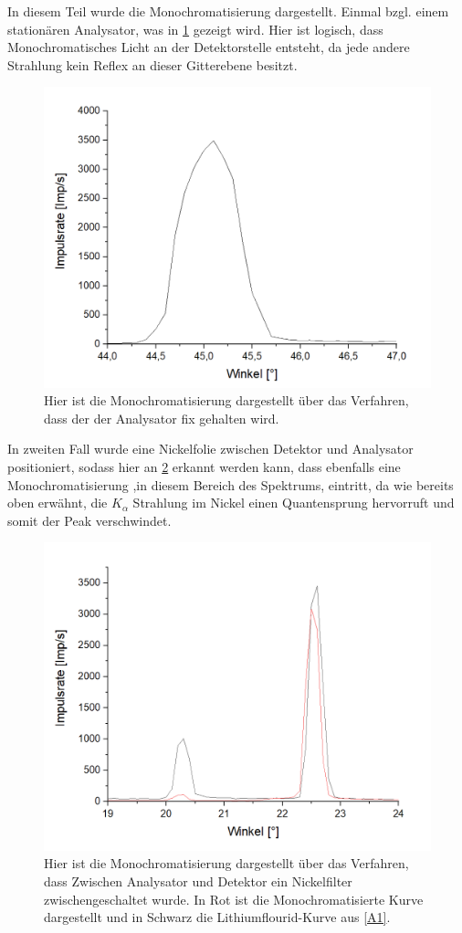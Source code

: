 \documentclass[
	a4paper,
	12pt,
	pagesize,
	ngerman
]{scrartcl}
\begin{document}
In diesem Teil wurde die Monochromatisierung dargestellt. Einmal bzgl. einem stationären Analysator, was in \cref{A6} gezeigt wird. Hier ist logisch, dass Monochromatisches Licht an der Detektorstelle entsteht, da jede andere Strahlung kein Reflex an dieser Gitterebene besitzt.
\begin{figure}[h!]
    \centering
    \includegraphics[scale = 0.6]{fest.png}
    \caption{Hier ist die Monochromatisierung dargestellt über das Verfahren, dass der der Analysator fix gehalten wird.}
    \label{A6}
\end{figure}
In zweiten Fall wurde eine Nickelfolie zwischen Detektor und Analysator positioniert, sodass hier an \cref{A7} erkannt werden kann, dass ebenfalls eine Monochromatisierung ,in diesem Bereich des Spektrums, eintritt, da wie bereits oben erwähnt, die $K_{\alpha}$ Strahlung im Nickel einen Quantensprung hervorruft und somit der Peak verschwindet.
\begin{figure}[h!]
    \centering
    \includegraphics[scale = 0.6]{abs-mono.png}
    \caption{Hier ist die Monochromatisierung dargestellt über das Verfahren, dass Zwischen Analysator und Detektor ein Nickelfilter zwischengeschaltet wurde. In Rot ist die Monochromatisierte Kurve dargestellt und in Schwarz die Lithiumflourid-Kurve aus \cref{A1}.}
    \label{A7}
\end{figure}
\end{document}
